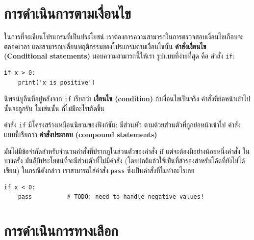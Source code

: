\section{การดำเนินการตามเงื่อนไข} %
\label{conditional.execution}


ในการที่จะเขียนโปรแกรมที่เป็นประโยชน์ เราต้องการความสามารถในการตรวจสอบเงื่อนไขเกือบจะตลอดเวลา
และสามารถเปลี่ยนพฤติกรรมของโปรแกรมตามเงื่อนไขนั้น {\bf คำสั่งเงื่อนไข (Conditional statements)} 
มอบความสามารถนี้ให้เรา รูปแบบที่ง่ายที่สุด คือ คำสั่ง {\tt if}:

\begin{verbatim}
if x > 0:
    print('x is positive')
\end{verbatim}
%
นิพจน์บูลีนที่อยู่หลังจาก {\tt if} เรียกว่า {\bf เงื่อนไข (condition)}
ถ้าเงื่อนไขเป็นจริง คำสั่งที่ย่อหน้าเข้าไปนั้นจะถูกรัน ไม่เช่นนั้น ก็ไม่มีอะไรเกิดขึ้น

คำสั่ง {\tt if} มีโครงสร้างเหมือนนิยามของฟังก์ชัน: มีส่วนหัว ตามด้วยส่วนตัวที่ถูกย่อหน้าเข้าไป
คำสั่งแบบนี้เรียกว่า {\bf คำสั่งประกอบ (compound statements)}

มันไม่มีข้อจำกัดสำหรับจำนวนคำสั่งที่ปรากฏในส่วนตัวของคำสั่ง if แต่จะต้องมีอย่างน้อยหนึ่งคำสั่ง
ในบางครั้ง มันก็มีประโยชน์ที่จะมีส่วนตัวที่ไม่มีคำสั่ง (โดยปกติแล้วใช้เป็นที่สำรองสำหรับโค้ดที่ยังไม่ได้เขียน)
ในกรณีดังกล่าว เราสามารถใส่คำสั่ง {\tt pass} ซึ่งเป็นคำสั่งที่ไม่ทำอะไรเลย 

\begin{verbatim}
if x < 0:
    pass          # TODO: need to handle negative values!
\end{verbatim}
%


\section{การดำเนินการทางเลือก} %
\label{alternative.execution}


